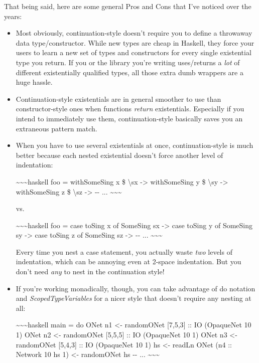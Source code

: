 \documentclass[]{article}
\begin{document}
That being said, here are some general Pros and Cons that I've noticed over the
years:

\begin{itemize}
\item
  Most obviously, continuation-style doesn't require you to define a throwaway
  data type/constructor. While new types are cheap in Haskell, they force your
  users to learn a new set of types and constructors for every single
  existential type you return. If you or the library you're writing uses/returns
  a \emph{lot} of different existentially qualified types, all those extra dumb
  wrappers are a huge hassle.
\item
  Continuation-style existentials are in general smoother to use than
  constructor-style ones when functions \emph{return} existentials. Especially
  if you intend to immediately use them, continuation-style basically saves you
  an extraneous pattern match.
\item
  When you have to use several existentials at once, continuation-style is much
  better because each nested existential doesn't force another level of
  indentation:

  \textasciitilde{}\textasciitilde{}\textasciitilde{}haskell foo = withSomeSing
  x \$ \textbackslash{}sx -\textgreater{} withSomeSing y \$ \textbackslash{}sy
  -\textgreater{} withSomeSing z \$ \textbackslash{}sz -\textgreater{} -\/- ...
  \textasciitilde{}\textasciitilde{}\textasciitilde{}

  vs.

  \textasciitilde{}\textasciitilde{}\textasciitilde{}haskell foo = case toSing x
  of SomeSing sx -\textgreater{} case toSing y of SomeSing sy -\textgreater{}
  case toSing z of SomeSing sz -\textgreater{} -\/- ...
  \textasciitilde{}\textasciitilde{}\textasciitilde{}

  Every time you nest a case statement, you actually waste \emph{two} levels of
  indentation, which can be annoying even at 2-space indentation. But you don't
  need \emph{any} to nest in the continuation style!
\item
  If you're working monadically, though, you can take advantage of do notation
  and \emph{ScopedTypeVariables} for a nicer style that doesn't require any
  nesting at all:

  \textasciitilde{}\textasciitilde{}\textasciitilde{}haskell main = do ONet n1
  \textless{}- randomONet {[}7,5,3{]} :: IO (OpaqueNet 10 1) ONet n2
  \textless{}- randomONet {[}5,5,5{]} :: IO (OpaqueNet 10 1) ONet n3
  \textless{}- randomONet {[}5,4,3{]} :: IO (OpaqueNet 10 1) hs \textless{}-
  readLn ONet (n4 :: Network 10 hs 1) \textless{}- randomONet hs -\/- ...
  \textasciitilde{}\textasciitilde{}\textasciitilde{}


\end{itemize}
\end{document}
